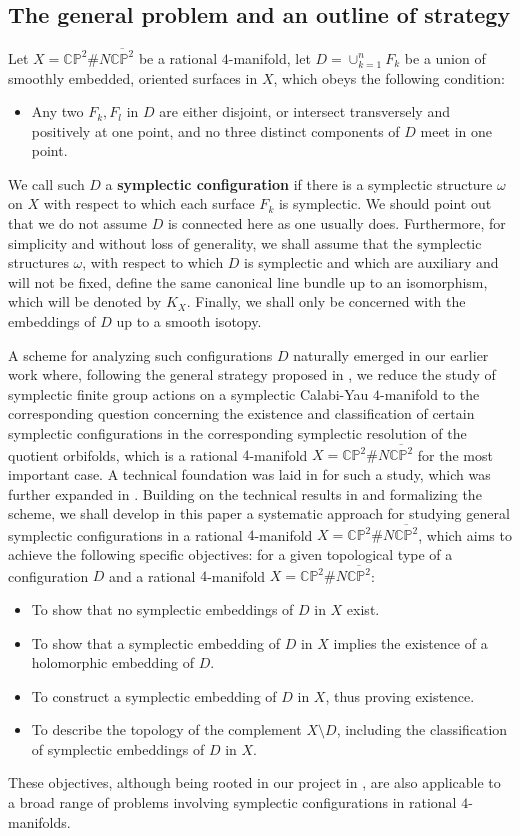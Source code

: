 \documentclass[11pt]{amsart}
\theoremstyle{plain}
\numberwithin{theorem}{section}
\theoremstyle{definition}
\newcommand{\C}{{\mathbb C}}
\renewcommand{\P}{{\mathbb P}}
\begin{document}
\subsection{The general problem and an outline of strategy}
Let $X=\C\P^2\# N\overline{\C\P^2}$ be a rational $4$-manifold, let $D=\cup_{k=1}^n F_k$ be a union of smoothly embedded, oriented surfaces in $X$, which obeys the following condition:
\begin{itemize}
\item [{(\dag)}] Any two $F_k,F_l$ in $D$ are either disjoint, or intersect transversely and positively at one point, and no three distinct components of $D$ meet in one point. 
\end{itemize}
We call such $D$ a {\bf symplectic configuration} if there is a symplectic structure $\omega$ on $X$ with respect to which each surface $F_k$ is symplectic. We should point out that we do not assume $D$ is connected 
here as one usually does. Furthermore, for simplicity and without loss of generality, we shall assume that the symplectic structures $\omega$, with respect to which $D$ is symplectic and which are auxiliary and will not be fixed, define the same canonical line bundle up to an isomorphism, which will be denoted by $K_X$. Finally, we shall only be concerned with the embeddings of $D$ up to a smooth isotopy. 

A scheme for analyzing such configurations $D$ naturally emerged in our earlier work \cite{C} where, following the general strategy proposed in \cite{C3}, we reduce the study of symplectic finite group actions on a symplectic Calabi-Yau $4$-manifold to the corresponding question concerning the existence and classification of certain 
symplectic configurations in the corresponding symplectic resolution of the quotient orbifolds, which is a rational $4$-manifold $X=\C\P^2\# N\overline{\C\P^2}$ for the most important case. A technical foundation was laid in \cite{C} for such a study, which was further expanded in \cite{C1}. Building on the technical results in \cite{C,C1} and formalizing the scheme, we shall develop in this paper a systematic approach for studying general symplectic configurations in  a rational $4$-manifold $X=\C\P^2\# N\overline{\C\P^2}$, which aims to achieve the following specific objectives: for a given topological type of a configuration $D$ and a rational $4$-manifold $X=\C\P^2\# N\overline{\C\P^2}$:
\begin{itemize}
\item [{(i)}] To show that no symplectic embeddings of $D$ in $X$ exist. 
\item [{(ii)}] To show that a symplectic embedding of $D$ in $X$ implies the existence of a holomorphic embedding of $D$.
\item [{(iii)}] To construct a symplectic embedding of $D$ in $X$, thus proving existence. 
\item [{(iv)}] To describe the topology of the complement $X\setminus D$, including the classification of symplectic embeddings of $D$ in $X$.
\end{itemize}
These objectives, although being rooted in our project in \cite{C,C1}, are also applicable to a broad range of problems involving symplectic configurations in rational $4$-manifolds. 
\end{document}
